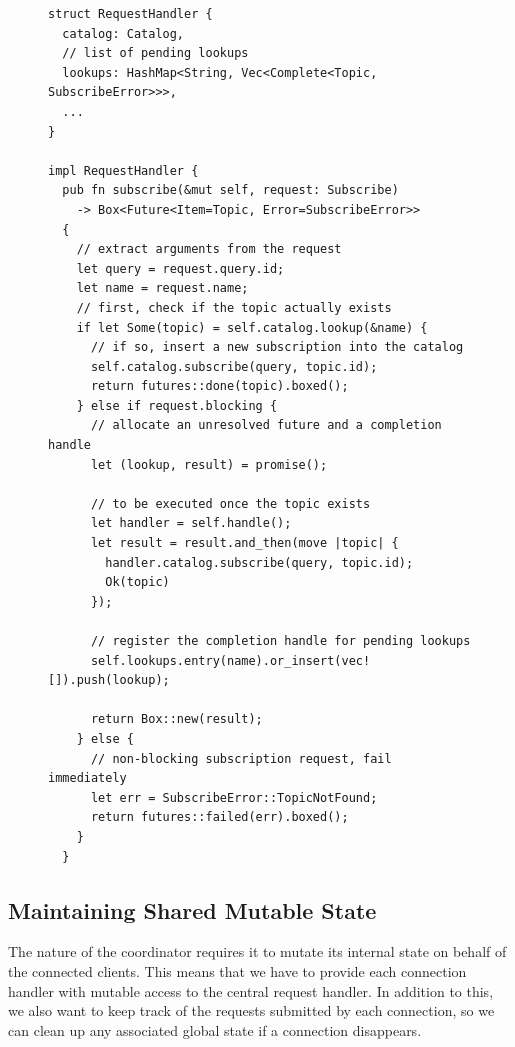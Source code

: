 \begin{figure}[p]
\begin{lstlisting}[caption={[Handler for blocking subscription requests]
Example how a future is created for the subscription request. Depending
on whether it can be served immediately or not, different kinds of futures
are returned. Bookkeeping for still pending requests is done with completion
handles. Upon publication of a requested topic, any pending subscriptions will
be completed by calling \lstinline{lookup.complete()}.},label={lst:fnsubscribe}]
struct RequestHandler {
  catalog: Catalog,
  // list of pending lookups
  lookups: HashMap<String, Vec<Complete<Topic, SubscribeError>>>,
  ...
}

impl RequestHandler {
  pub fn subscribe(&mut self, request: Subscribe)
    -> Box<Future<Item=Topic, Error=SubscribeError>>
  {
    // extract arguments from the request
    let query = request.query.id;
    let name = request.name;
    // first, check if the topic actually exists
    if let Some(topic) = self.catalog.lookup(&name) {
      // if so, insert a new subscription into the catalog
      self.catalog.subscribe(query, topic.id);
      return futures::done(topic).boxed();
    } else if request.blocking {
      // allocate an unresolved future and a completion handle
      let (lookup, result) = promise();

      // to be executed once the topic exists
      let handler = self.handle();
      let result = result.and_then(move |topic| {
        handler.catalog.subscribe(query, topic.id);
        Ok(topic)
      });

      // register the completion handle for pending lookups
      self.lookups.entry(name).or_insert(vec![]).push(lookup);

      return Box::new(result);
    } else {
      // non-blocking subscription request, fail immediately
      let err = SubscribeError::TopicNotFound;
      return futures::failed(err).boxed();
    }
  }
\end{lstlisting}
\end{figure}

\subsection{Maintaining Shared Mutable State}

The nature of the coordinator requires it to mutate its internal state on
behalf of the connected clients. This means that we have to provide each
connection handler with mutable access to the central request handler. 
In addition to this, we also want to keep track of the requests submitted by
each connection, so we can clean up any associated global state if a connection
disappears.

